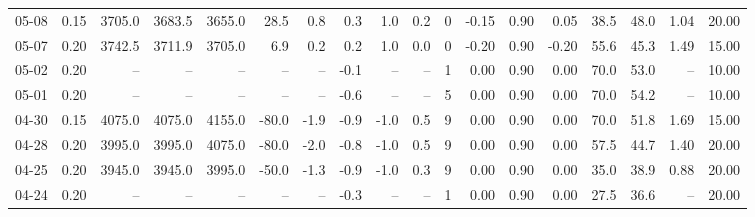 \begin{threeparttable}
{\begin{tabular}{lrrrrrrrrrrrrrrrrr}
  05-08 &     0.15 & 3705.0 & 3683.5 & 3655.0 &       28.5 &            0.8 &                       0.3 &                      1.0 &                 0.2 &              0 &      -0.15 &      0.90 &           0.05 &             38.5 &                48.0 &            1.04 &                  20.00 \\
  05-07 &     0.20 & 3742.5 & 3711.9 & 3705.0 &        6.9 &            0.2 &                       0.2 &                      1.0 &                 0.0 &              0 &      -0.20 &      0.90 &          -0.20 &             55.6 &                45.3 &            1.49 &                  15.00 \\
  05-02 &     0.20 &     -- &     -- &     -- &         -- &             -- &                      -0.1 &                       -- &                  -- &              1 &       0.00 &      0.90 &           0.00 &             70.0 &                53.0 &              -- &                  10.00 \\
  05-01 &     0.20 &     -- &     -- &     -- &         -- &             -- &                      -0.6 &                       -- &                  -- &              5 &       0.00 &      0.90 &           0.00 &             70.0 &                54.2 &              -- &                  10.00 \\
  04-30 &     0.15 & 4075.0 & 4075.0 & 4155.0 &      -80.0 &           -1.9 &                      -0.9 &                     -1.0 &                 0.5 &              9 &       0.00 &      0.90 &           0.00 &             70.0 &                51.8 &            1.69 &                  15.00 \\
  04-28 &     0.20 & 3995.0 & 3995.0 & 4075.0 &      -80.0 &           -2.0 &                      -0.8 &                     -1.0 &                 0.5 &              9 &       0.00 &      0.90 &           0.00 &             57.5 &                44.7 &            1.40 &                  20.00 \\
  04-25 &     0.20 & 3945.0 & 3945.0 & 3995.0 &      -50.0 &           -1.3 &                      -0.9 &                     -1.0 &                 0.3 &              9 &       0.00 &      0.90 &           0.00 &             35.0 &                38.9 &            0.88 &                  20.00 \\
  04-24 &     0.20 &     -- &     -- &     -- &         -- &             -- &                      -0.3 &                       -- &                  -- &              1 &       0.00 &      0.90 &           0.00 &             27.5 &                36.6 &              -- &                  20.00 \\

\end{tabular}}
\end{threeparttable}
